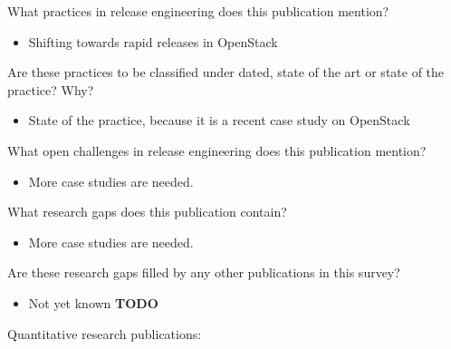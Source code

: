 \documentclass[]{book}
\providecommand{\tightlist}{%
  \setlength{\itemsep}{0pt}\setlength{\parskip}{0pt}}
\begin{document}
What practices in release engineering does this publication mention?

\begin{itemize}
\tightlist
\item
  Shifting towards rapid releases in OpenStack
\end{itemize}

Are these practices to be classified under dated, state of the art or
state of the practice? Why?

\begin{itemize}
\tightlist
\item
  State of the practice, because it is a recent case study on OpenStack
\end{itemize}

What open challenges in release engineering does this publication
mention?

\begin{itemize}
\tightlist
\item
  More case studies are needed.
\end{itemize}

What research gaps does this publication contain?

\begin{itemize}
\tightlist
\item
  More case studies are needed.
\end{itemize}

Are these research gaps filled by any other publications in this survey?

\begin{itemize}
\tightlist
\item
  Not yet known \textbf{TODO}
\end{itemize}

Quantitative research publications:
\end{document}
